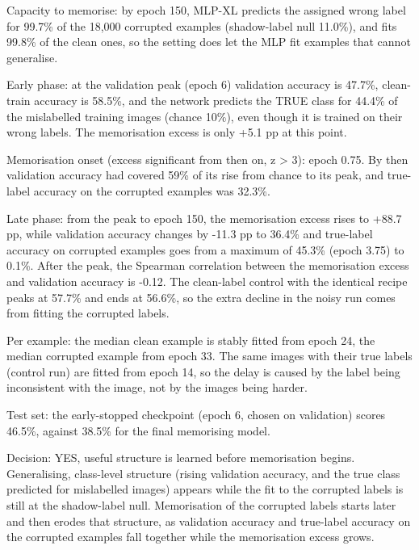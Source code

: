 Capacity to memorise: by epoch 150, MLP-XL predicts the assigned wrong label for 99.7\% of the 18,000 corrupted examples (shadow-label null 11.0\%), and fits 99.8\% of the clean ones, so the setting does let the MLP fit examples that cannot generalise.

Early phase: at the validation peak (epoch 6) validation accuracy is 47.7\%, clean-train accuracy is 58.5\%, and the network predicts the TRUE class for 44.4\% of the mislabelled training images (chance 10\%), even though it is trained on their wrong labels. The memorisation excess is only +5.1 pp at this point.

Memorisation onset (excess significant from then on, z > 3): epoch 0.75. By then validation accuracy had covered 59\% of its rise from chance to its peak, and true-label accuracy on the corrupted examples was 32.3\%.

Late phase: from the peak to epoch 150, the memorisation excess rises to +88.7 pp, while validation accuracy changes by -11.3 pp to 36.4\% and true-label accuracy on corrupted examples goes from a maximum of 45.3\% (epoch 3.75) to 0.1\%. After the peak, the Spearman correlation between the memorisation excess and validation accuracy is -0.12. The clean-label control with the identical recipe peaks at 57.7\% and ends at 56.6\%, so the extra decline in the noisy run comes from fitting the corrupted labels.

Per example: the median clean example is stably fitted from epoch 24, the median corrupted example from epoch 33. The same images with their true labels (control run) are fitted from epoch 14, so the delay is caused by the label being inconsistent with the image, not by the images being harder.

Test set: the early-stopped checkpoint (epoch 6, chosen on validation) scores 46.5\%, against 38.5\% for the final memorising model.

Decision: YES, useful structure is learned before memorisation begins. Generalising, class-level structure (rising validation accuracy, and the true class predicted for mislabelled images) appears while the fit to the corrupted labels is still at the shadow-label null. Memorisation of the corrupted labels starts later and then erodes that structure, as validation accuracy and true-label accuracy on the corrupted examples fall together while the memorisation excess grows.
